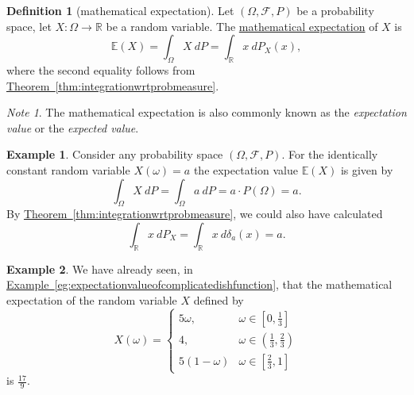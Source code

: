 \documentclass[a4paper,12pt]{scrreprt}
\newcommand{\R}{\mathbb{R}}
\newcommand{\defn}[1]{\ul{#1}}
\theoremstyle{definition}
\newtheorem{definition}{Definition}[section]
\newtheorem{example}{Example}[section]
\theoremstyle{plain}
\theoremstyle{remark}
\newtheorem{note}{Note}[section]
\begin{document}
\begin{definition}[mathematical expectation]
  \label{def:mathematicalexpectation}
  Let $(\Omega,\mathcal{F}, P)$ be a probability space, let $X\colon \Omega \to \R$ be a random variable. The \defn{mathematical expectation} of $X$ is
  \begin{equation*}
    \mathbb{E}(X) = \int_{\Omega} X\ dP = \int_{\R} x\ dP_{X}(x),
  \end{equation*}
  where the second equality follows from \hyperref[thm:integrationwrtprobmeasure]{Theorem~\ref*{thm:integrationwrtprobmeasure}}.
\end{definition}

\begin{note}
  The mathematical expectation is also commonly known as the \emph{expectation value} or the \emph{expected value}.
\end{note}

\begin{example}
  Consider any probability space $(\Omega, \mathcal{F}, P)$. For the identically constant random variable $X(\omega) = a$ the expectation value $\mathbb{E}(X)$ is given by
  \begin{equation*}
    \int_{\Omega} X\ dP = \int_{\Omega} a\ dP = a\cdot P(\Omega) = a.
  \end{equation*}
  By \hyperref[thm:integrationwrtprobmeasure]{Theorem~\ref*{thm:integrationwrtprobmeasure}}, we could also have calculated
  \begin{equation*}
    \int_{\R} x\ dP_{X} = \int_{\R} x\ d\delta_{a}(x) = a.
  \end{equation*}
\end{example}

\begin{example}
  We have already seen, in \hyperref[eg:expectationvalueofcomplicatedishfunction]{Example~\ref*{eg:expectationvalueofcomplicatedishfunction}}, that the mathematical expectation of the random variable $X$ defined by
  \begin{equation*}
    X(\omega) =
    \begin{cases}
      5\omega, & \omega \in \left[ 0, \frac{1}{3} \right] \\
      4, & \omega \in \left( \frac{1}{3}, \frac{2}{3} \right) \\
      5(1-\omega) & \omega \in \left[ \frac{2}{3}, 1 \right]
    \end{cases}
  \end{equation*}
  is $\frac{17}{9}$.
\end{example}
\end{document}
